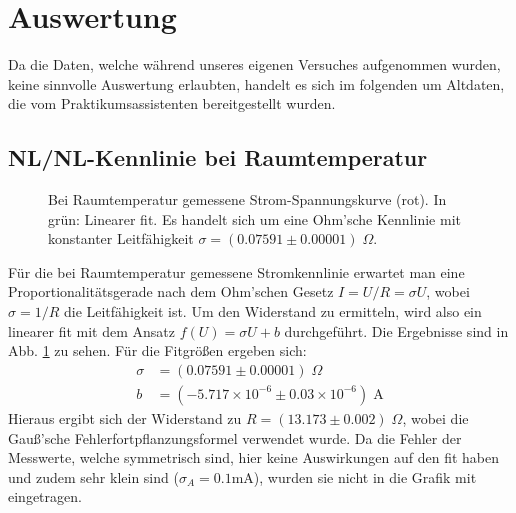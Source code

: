 \documentclass[twoside,        %
               BCOR12mm,       %
               english,ngerman, %
               fleqn,headsepline=false,footsepline=false
              ]{Vorlage/MFPREPORT}
\begin{document}
\section{Auswertung}
\label{sec:auswertung}
Da die Daten, welche während unseres eigenen Versuches aufgenommen wurden,
keine sinnvolle Auswertung erlaubten, handelt es sich im folgenden um Altdaten,
die vom Praktikumsassistenten bereitgestellt wurden.
\subsection{NL/NL-Kennlinie bei Raumtemperatur}
\begin{figure}[]
    \centering
    
    \caption{Bei Raumtemperatur gemessene Strom-Spannungskurve (rot). In grün:
    Linearer fit. Es handelt sich
    um eine Ohm'sche Kennlinie mit konstanter Leitfähigkeit 
    $\sigma=(0.07591\pm0.00001)\;\Omega$.}
    \label{fig:1}
\end{figure}
Für die bei Raumtemperatur gemessene Stromkennlinie erwartet man eine
Proportionalitätsgerade nach dem Ohm'schen Gesetz $I=U/R=\sigma U$, wobei
$\sigma=1/R$ die Leitfähigkeit ist. Um den Widerstand zu
ermitteln, wird also ein linearer fit mit dem Ansatz $f(U)=\sigma U+b$ durchgeführt. Die Ergebnisse sind in Abb.
\ref{fig:1} zu sehen. Für die Fitgrößen ergeben sich:
\begin{align}
    \sigma&=(0.07591\pm0.00001)\;\Omega\\
    b&=(-5.717\times10^{-6}\pm0.03\times10^{-6})\;\text{A}
    \label{eq:linfit}
\end{align}
Hieraus ergibt sich der Widerstand zu $R=(13.173\pm0.002)\;\Omega$, wobei die
Gauß'sche Fehlerfortpflanzungsformel verwendet wurde. Da die Fehler der
Messwerte, welche
symmetrisch sind,
hier keine Auswirkungen auf den fit haben und zudem sehr klein sind
($\sigma_A=0.1$\;mA), wurden sie nicht in die Grafik mit eingetragen.
\end{document}
